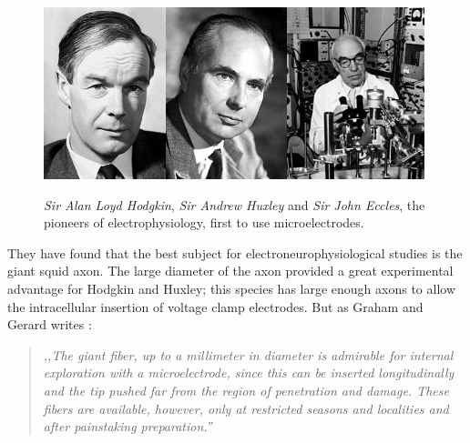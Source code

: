\begin{figure}
\centering
\includegraphics[height=5cm, keepaspectratio]{img/theory/hodgkin.jpg}\includegraphics[height=5cm, keepaspectratio]{img/theory/huxley.jpg}\includegraphics[height=5cm, keepaspectratio]{img/theory/eccles.jpg}
\caption[The pioneers of electrophysiology, the first to use microelectrodes.]{\emph{Sir Alan Loyd Hodgkin}, \emph{Sir Andrew Huxley} and \emph{Sir John Eccles}, the pioneers of electrophysiology, first to use microelectrodes.}
\label{fig:pioneers}
\end{figure}

They have found that the best subject for electroneurophysiological studies is the giant squid axon.
The large diameter of the axon provided a great experimental advantage for Hodgkin and Huxley; this species has large enough axons to allow the intracellular insertion of voltage clamp electrodes.
But as Graham and Gerard writes \cite{graham1946judith}:

\begin{quote}
\vspace{0.5cm}
\emph{,,The giant fiber, up to a millimeter in diameter is admirable for internal exploration with a microelectrode, since this can be inserted longitudinally and the tip pushed far from the region of penetration and damage.
These fibers are available, however, only at restricted seasons and localities and after painstaking preparation.''}
\vspace{0.5cm}
\end{quote}

